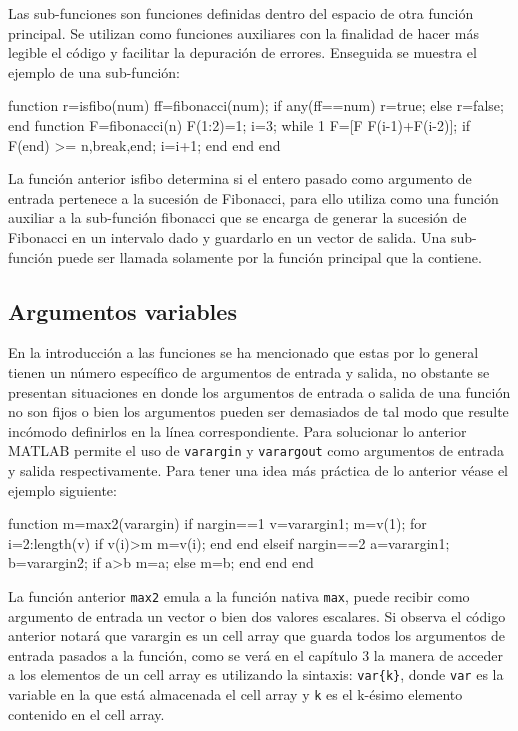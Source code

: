 Las sub-funciones son funciones definidas dentro del espacio de otra
función principal. Se utilizan como funciones auxiliares con la
finalidad de hacer más legible el código y facilitar la depuración de
errores. Enseguida se muestra el ejemplo de una sub-función:

\begin{matlab}
function r=isfibo(num)
ff=fibonacci(num);
if any(ff==num)
    r=true;
else
    r=false;
end
    function F=fibonacci(n)
        F(1:2)=1;
        i=3;
        while 1
            F=[F F(i-1)+F(i-2)];
            if F(end) >= n,break,end;
            i=i+1;
        end
    end
end
\end{matlab}

La función anterior isfibo determina si el entero pasado como argumento
de entrada pertenece a la sucesión de Fibonacci, para ello utiliza como
una función auxiliar a la sub-función fibonacci que se encarga de
generar la sucesión de Fibonacci en un intervalo dado y guardarlo en un
vector de salida. Una sub-función puede ser llamada solamente por la
función principal que la contiene.

\subsection{Argumentos variables}\label{argumentos-variables}

En la introducción a las funciones se ha mencionado que estas por lo
general tienen un número específico de argumentos de entrada y salida,
no obstante se presentan situaciones en donde los argumentos de entrada
o salida de una función no son fijos o bien los argumentos pueden ser
demasiados de tal modo que resulte incómodo definirlos en la línea
correspondiente. Para solucionar lo anterior MATLAB permite el uso de
\texttt{varargin} y \texttt{varargout} como argumentos de entrada y salida
respectivamente. Para tener una idea más práctica de lo anterior véase
el ejemplo siguiente:

\begin{matlab}
function m=max2(varargin)
if nargin==1
    v=varargin{1};
    m=v(1);
    for i=2:length(v)
        if v(i)>m
            m=v(i);
        end
    end 
elseif nargin==2
    a=varargin{1};
    b=varargin{2};
    if a>b
        m=a;
    else
        m=b;
    end
end
end
\end{matlab}

La función anterior \texttt{max2} emula a la función nativa \texttt{max}, puede recibir
como argumento de entrada un vector o bien dos valores escalares. Si
observa el código anterior notará que varargin es un cell array que
guarda todos los argumentos de entrada pasados a la función, como se
verá en el capítulo 3 la manera de acceder a los elementos de un cell
array es utilizando la sintaxis: \texttt{var\{k\}}, donde \texttt{var}
es la variable en la que está almacenada el cell array y \texttt{k} es
el k-ésimo elemento contenido en el cell array.

